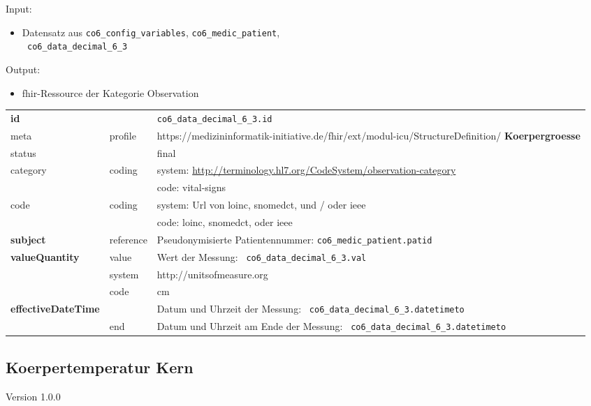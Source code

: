 \noindent Input:
\begin{itemize}
	\item Datensatz aus \texttt{co6\_config\_variables}, \texttt{co6\_medic\_patient}, \\ \texttt{
co6\_data\_decimal\_6\_3}
\end{itemize}
Output:
\begin{itemize}
        \item \ac{fhir}-Ressource der Kategorie \glqq Observation\grqq{}
\end{itemize}
\begin{longtable}{|l|l|p{7.5cm}|}
        \hline
        \rowcolor{lightgray} \multicolumn{3}{|l|}{Data Mapping (inhaltlich)} \\ \hline
        \textbf{id} &  & \texttt{co6\_data\_decimal\_6\_3.id} \\ \hline
	meta & profile & https://medizininformatik-initiative.de/fhir/ext/modul-icu/StructureDefinition/\textbf{
Koerpergroesse} \\ \hline 
	status &  & final   \\ \hline 
	category & coding & system: \url{http://terminology.hl7.org/CodeSystem/observation-category} \\
\cline{3-3}
	& & code: vital-signs \\ \hline
	code & coding & system: Url von \ac{loinc}, \ac{snomedct}, und / oder \ac{ieee} \\ 
	\cline{3-3} 
	 &  & code: \ac{loinc}, \ac{snomedct}, oder \ac{ieee} \\ \hline
	 \textbf{subject}  & reference & Pseudonymisierte Patientennummer: \texttt{co6\_medic\_patient.patid} \\ \hline
	 \textbf{valueQuantity}  & value & Wert der Messung: \texttt{
co6\_data\_decimal\_6\_3.val} \\
        \cline{2-3}
         & system & http://unitsofmeasure.org \\
         \cline{2-3}
         & code & cm \\ \hline
     \textbf{effectiveDateTime}  & & Datum und Uhrzeit der Messung: \texttt{
co6\_data\_decimal\_6\_3.datetimeto} \\
    \cline{2-3}
     & end & Datum und Uhrzeit am Ende der Messung: \texttt{
co6\_data\_decimal\_6\_3.datetimeto} \\ \hline
\end{longtable}


\subsection{Koerpertemperatur Kern} 
\noindent Version 1.0.0

